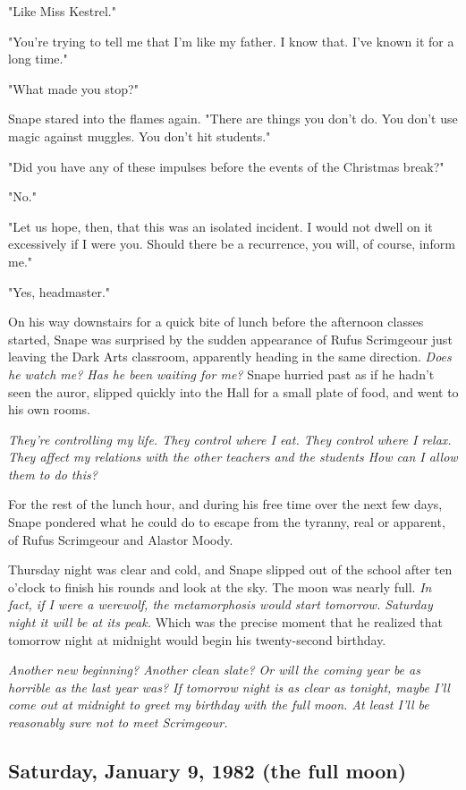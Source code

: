 "Like Miss Kestrel."

"You're trying to tell me that I'm like my father. I know that. I've known it for a long time."

"What made you stop?"

Snape stared into the flames again. "There are things you don't do. You don't use magic against muggles. You don't hit students."

"Did you have any of these impulses before the{\el} events{\el} of the Christmas break?"

"No."

"Let us hope, then, that this was an isolated incident. I would not dwell on it excessively if I were you. Should there be a recurrence, you will, of course, inform me."

"Yes, headmaster."

On his way downstairs for a quick bite of lunch before the afternoon classes started, Snape was surprised by the sudden appearance of Rufus Scrimgeour just leaving the Dark Arts classroom, apparently heading in the same direction. \emph{Does he watch me? Has he been waiting for me?} Snape hurried past as if he hadn't seen the auror, slipped quickly into the Hall for a small plate of food, and went to his own rooms.

\emph{They're controlling my life. They control where I eat. They control where I relax. They affect my relations with the other teachers and the students{\el} How can I allow them to do this?}

For the rest of the lunch hour, and during his free time over the next few days, Snape pondered what he could do to escape from the tyranny, real or apparent, of Rufus Scrimgeour and Alastor Moody.

Thursday night was clear and cold, and Snape slipped out of the school after ten o'clock to finish his rounds and look at the sky. The moon was nearly full. \emph{In fact, if I were a werewolf, the metamorphosis would start tomorrow. Saturday night it will be at its peak.} Which was the precise moment that he realized that tomorrow night at midnight would begin his twenty-second birthday.

\emph{Another new beginning? Another clean slate? Or will the coming year be as horrible as the last year was? If tomorrow night is as clear as tonight, maybe I'll come out at midnight to greet my birthday with the full moon. At least I'll be reasonably sure not to meet Scrimgeour.}

\subsection{Saturday, January 9, 1982 (the full moon)}

